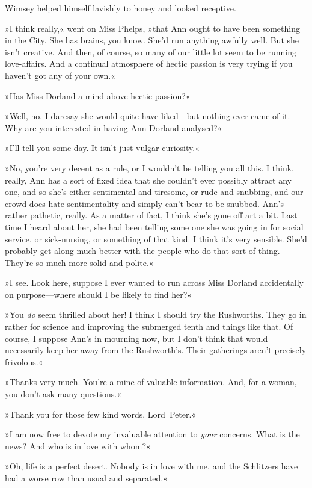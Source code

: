 Wimsey helped himself lavishly to honey and looked receptive.

»I think really,« went on Miss Phelps, »that Ann ought to have been something in the City. She has brains, you know. She'd run anything awfully well. But she isn't creative. And then, of course, so many of our little lot seem to be running love-affairs. And a continual atmosphere of hectic passion is very trying if you haven't got any of your own.«

»Has Miss Dorland a mind above hectic passion?«

»Well, no. I daresay she would quite have liked—but nothing ever came of it. Why are you interested in having Ann Dorland analysed?«

»I'll tell you some day. It isn't just vulgar curiosity.«

»No, you're very decent as a rule, or I wouldn't be telling you all this. I think, really, Ann has a sort of fixed idea that she couldn't ever possibly attract any one, and so she's either sentimental and tiresome, or rude and snubbing, and our crowd does hate sentimentality and simply can't bear to be snubbed. Ann's rather pathetic, really. As a matter of fact, I think she's gone off art a bit. Last time I heard about her, she had been telling some one she was going in for social service, or sick-nursing, or something of that kind. I think it's very sensible. She'd probably get along much better with the people who do that sort of thing. They're so much more solid and polite.«

»I see. Look here, suppose I ever wanted to run across Miss Dorland accidentally on purpose—where should I be likely to find her?«

»You \textit{do} seem thrilled about her! I think I should try the Rushworths. They go in rather for science and improving the submerged tenth and things like that. Of course, I suppose Ann's in mourning now, but I don't think that would necessarily keep her away from the Rushworth's. Their gatherings aren't precisely frivolous.«

»Thanks very much. You're a mine of valuable information. And, for a woman, you don't ask many questions.«

»Thank you for those few kind words, Lord~Peter.«

»I am now free to devote my invaluable attention to \textit{your} concerns. What is the news? And who is in love with whom?«

»Oh, life is a perfect desert. Nobody is in love with me, and the Schlitzers have had a worse row than usual and separated.«

